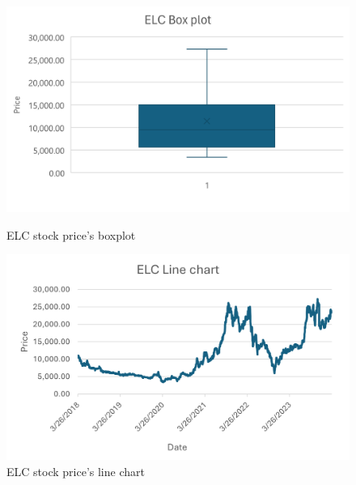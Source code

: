 \documentclass[conference]{IEEEtran}
\begin{document}
\begin{figure}[H]
    \centering
    \begin{minipage}{0.23\textwidth}
    \centering
    \includegraphics[width=1\textwidth]{Figure/elc-box.png}
    \caption{ELC stock price's boxplot}
    \label{fig:1}
    \end{minipage}
    \hfill
    \begin{minipage}{0.23\textwidth}
    \centering
    \includegraphics[width=1\textwidth]{Figure/elc-line.png}
    \caption{ELC stock price's line chart}
    \label{fig:2}
    \end{minipage}
\end{figure}
\end{document}
